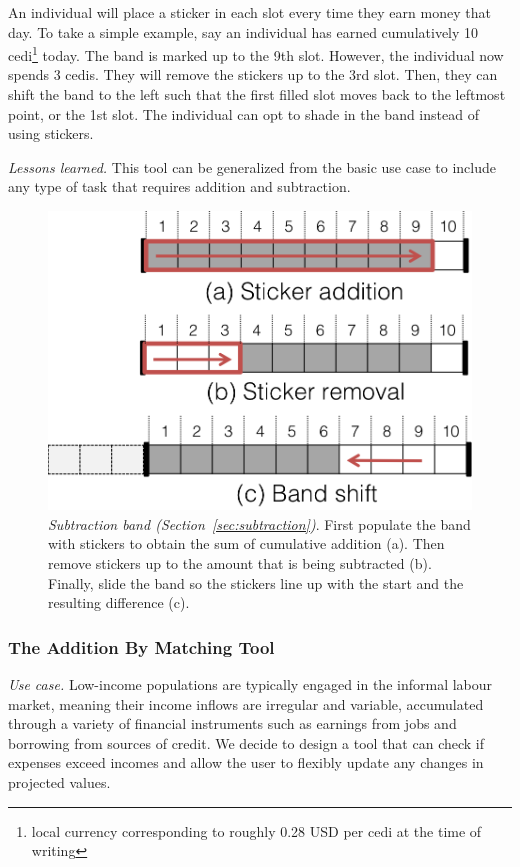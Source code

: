 \documentclass{sig-alternate}
\begin{document}
An individual will place a sticker in each slot every time they earn money that day. To take a simple example, say an individual has earned cumulatively 10 cedi\footnote{local currency corresponding to roughly 0.28 USD per cedi at the time of writing} today. The band is marked up to the 9th slot. However, the individual now spends 3 cedis. They will remove the stickers up to the 3rd slot. Then, they can shift the band to the left such that the first filled slot moves back to the leftmost point, or the 1st slot.
The individual can opt to shade in the band instead of using stickers.

\emph{Lessons learned.}
This tool can be generalized from the basic use case to include any type of task that requires addition and subtraction. 

\begin{figure}
\centering
\includegraphics[width=.6\linewidth]{img/band.png}
\caption{\emph{Subtraction band (Section~\ref{sec:subtraction})}. First populate the band with stickers to obtain the sum of cumulative addition (a). Then remove stickers up to the amount that is being subtracted (b). Finally, slide the band so the stickers line up with the start and the resulting difference (c).}
\label{fig:band}
\end{figure}

\subsubsection{The Addition By Matching Tool}
\label{sec:add}

\emph{Use case.} Low-income populations are typically engaged in the informal labour market, meaning their income inflows are irregular and variable, accumulated through a variety of financial instruments such as earnings from jobs and borrowing from sources of credit. We decide to design a tool that can check if expenses exceed incomes and allow the user to flexibly update any changes in projected values.
\end{document}

